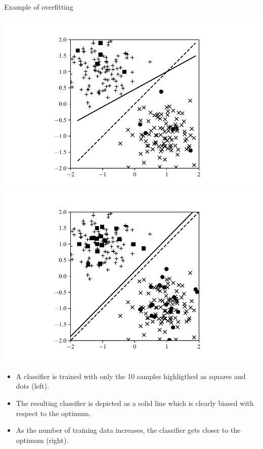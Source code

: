 \documentclass{beamer}
\begin{document}
\begin{frame}{Example of overfitting}
    \begin{center}
    \includegraphics[scale=0.39]{Module 1 (NN)/pics/example_161_5_.pdf} \includegraphics[scale=0.39]{Module 1 (NN)/pics/example_161_20_.pdf}
    \end{center}
\begin{itemize}
\item A classifier is trained with only the 10 samples highligthed as squares and dots (left). 
\item The resulting classifier is depicted as a solid line which is clearly biased with respect to the optimum.
\item As the number of training data increases, the classifier gets closer to the optimum (right).
\end{itemize}
\end{frame}
\end{document}
